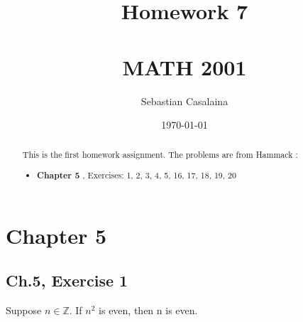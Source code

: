 \documentclass[12pt]{amsart}
\numberwithin{equation}{section}
\theoremstyle{definition}
\theoremstyle{remark}
\begin{document}




\author[Casalaina]{Sebastian Casalaina}
\address{University of Colorado, Department of Mathematics,  Campus Box 395,
Boulder, CO 80309-0395}
\date{\today}



\title[Homework 7]{Homework 7 \\ \ \\  MATH 2001}

\begin{abstract} 
This is the first homework assignment.  The problems are from Hammack \cite[Ch.5]{H13}:
\begin{itemize}

\item \textbf{Chapter 5}  
\textbf{}, Exercises:  1, 2, 3, 4, 5, 16, 17, 18, 19, 20

\end{itemize}
\end{abstract}


\maketitle


\tableofcontents





\section*{Chapter 5}



\subsection*{Ch.5,  Exercise 1}  Suppose $ n \in \mathbb{Z} $. If $ n^2 $ is even, then n is even.
\end{document}
